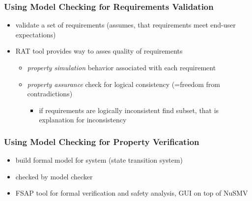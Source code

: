 \documentclass[a4paper, 10pt]{article}
\begin{document}
\subsubsection*{Using Model Checking for Requirements Validation}
\begin{itemize}
    \item validate a set of requirements (assumes, that requirements meet end-user expectations)
    \item RAT tool provides way to asses quality of requirements
    \begin{itemize}
        \item \emph{property simulation} \follows behavior associated with each requirement
        \item \emph{property assurance} check for logical consistency (=freedom from contradictions)
        \begin{itemize}
            \item if requirements are logically inconsistent \follows find subset, that is explanation for inconsistency
        \end{itemize}
    \end{itemize}
\end{itemize}

\subsubsection*{Using Model Checking for Property Verification}
\begin{itemize}
    \item build formal model for system (state transition system)
    \item checked by model checker
    \item FSAP tool for formal verification and safety analysis, GUI on top of NuSMV
\end{itemize}
\end{document}
